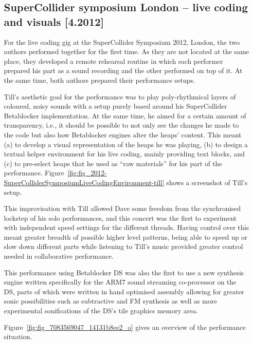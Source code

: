 \documentclass[letterpaper, 12pt]{article}
\begin{document}
\subsection{SuperCollider symposium London -- live coding and visuals [4.2012]}
\label{sub:livecoding_and_visuals}

For the live coding gig at the SuperCollider Symposium 2012, London, the two authors performed together for the first time.
As they are not located at the same place, they developed a remote rehearsal routine in which each performer prepared his part as a sound recording and the other performed on top of it.
At the same time, both authors prepared their performance setups.

Till's aesthetic goal for the performance was to play poly-rhythmical layers of coloured, noisy sounds with a setup purely based around his SuperCollider Betablocker implementation.
At the same time, he aimed for a certain amount of transparency, i.e., it should be possible to not only see the changes he made to the code but also how  Betablocker engines alter the heaps' content.
This meant
(a) to develop a visual representation of the heaps he was playing,
(b) to design a textual helper environment for his live coding, mainly providing text blocks, and
(c) to pre-select heaps that he used as ``raw materials'' for his part of the  performance.
Figure~\ref{fig:fig_2012-SuperColliderSymposiumLiveCodingEnvironment-till} shows a screenshot of Till's setup.


This improvisation with Till allowed Dave some freedom from the synchronised lockstep of his solo performances, and this concert was the first to experiment with independent speed settings for the different threads. Having control over this meant greater breadth of possible higher level patterns, being able to speed up or slow down different parts while listening to Till's music provided greater control needed in collaborative performance.

This performance using Betablocker DS was also the first to use a new synthesis engine written specifically for the ARM7 sound streaming co-processor on the DS, parts of which were written in hand optimised assembly allowing for greater sonic possibilities such as subtractive and FM synthesis as well as more experimental sonifications of the DS's tile graphics memory area.

Figure~\ref{fig:fig_7083569047_14131b8ee2_o} gives an overview of the performance situation.
\end{document}

